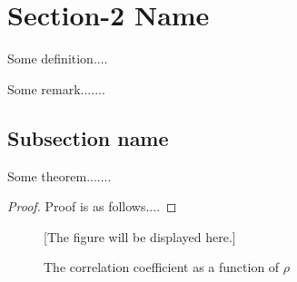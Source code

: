 \section{Section-2 Name}
\begin{definition}\label{abc}
Some definition....
\end{definition}

\begin{remark}
Some remark.......
\end{remark}

\subsection{Subsection name}

\begin{theorem}
Some theorem.......
\end{theorem}

\begin{proof}
Proof is as follows....
\end{proof}


\begin{figure}[hH]

[The figure will be displayed here.]

\caption{The correlation coefficient as a function of $\rho$}
\end{figure}


